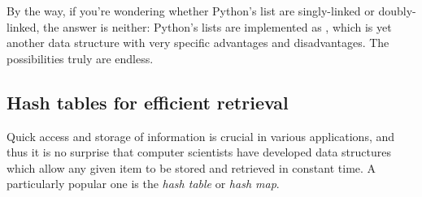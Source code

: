 \begin{programming}
By the way, if you're wondering whether Python's list are singly-linked or doubly-linked, the answer is neither: Python's lists are implemented as , which is yet another data structure with very specific advantages and disadvantages.
The possibilities truly are endless.

\subsection{Hash tables for efficient retrieval}
\label{ssec:listphonology_code_hashmaps}


Quick access and storage of information is crucial in various applications, and thus it is no surprise that computer scientists have developed data structures which allow any given item to be stored and retrieved in constant time.
A particularly popular one is the \emph{hash table} or \emph{hash map}.


\end{programming}
